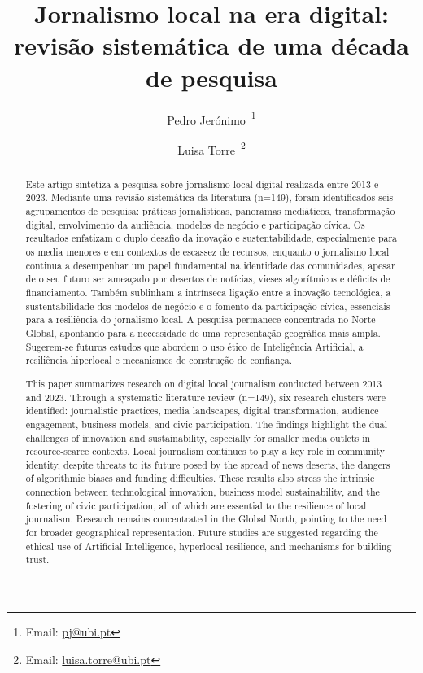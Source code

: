 \documentclass[portuguese]{textolivre}
\title{Jornalismo local na era digital: revisão sistemática de uma década de pesquisa}
\author[1]{Pedro Jerónimo~\orcid{0000-0003-1900-5031}\thanks{Email: \href{mailto:pj@ubi.pt}{pj@ubi.pt}}}
\author[1]{Luisa Torre~\orcid{0000-0002-5948-106X}\thanks{Email: \href{mailto:luisa.torre@ubi.pt}{luisa.torre@ubi.pt}}}
\affil[1]{Universidade da Beira Interior, Faculdade de Artes e Letras, Departamento de Comunicação, Filosofia e Política, LabCom - Laboratório de Comunicação, Covilhã, Portugal.}
\begin{document}
\maketitle

\begin{polyabstract}
\begin{abstract}
Este artigo sintetiza a pesquisa sobre jornalismo local digital realizada entre 2013 e 2023. Mediante uma revisão sistemática da literatura (n=149), foram identificados seis agrupamentos de pesquisa: práticas jornalísticas, panoramas mediáticos, transformação digital, envolvimento da audiência, modelos de negócio e participação cívica. Os resultados enfatizam o duplo desafio da inovação e sustentabilidade, especialmente para os media menores e em contextos de escassez de recursos, enquanto o jornalismo local continua a desempenhar um papel fundamental na identidade das comunidades, apesar de o seu futuro ser ameaçado por desertos de notícias, vieses algorítmicos e déficits de financiamento. Também sublinham a intrínseca ligação entre a inovação tecnológica, a sustentabilidade dos modelos de negócio e o fomento da participação cívica, essenciais para a resiliência do jornalismo local. A pesquisa permanece concentrada no Norte Global, apontando para a necessidade de uma representação geográfica mais ampla. Sugerem-se futuros estudos que abordem o uso ético de Inteligência Artificial, a resiliência hiperlocal e mecanismos de construção de confiança.

\end{abstract}

\begin{english}
\begin{abstract}
This paper summarizes research on digital local journalism conducted between 2013 and 2023. Through a systematic literature review (n=149), six research clusters were identified: journalistic practices, media landscapes, digital transformation, audience engagement, business models, and civic participation. The findings highlight the dual challenges of innovation and sustainability, especially for smaller media outlets in resource-scarce contexts. Local journalism continues to play a key role in community identity, despite threats to its future posed by the spread of news deserts, the dangers of algorithmic biases and funding difficulties. These results also stress the intrinsic connection between technological innovation, business model sustainability, and the fostering of civic participation, all of which are essential to the resilience of local journalism. Research remains concentrated in the Global North, pointing to the need for broader geographical representation. Future studies are suggested regarding the ethical use of Artificial Intelligence, hyperlocal resilience, and mechanisms for building trust.


\end{abstract}
\end{english}
\end{polyabstract}
\end{document}
